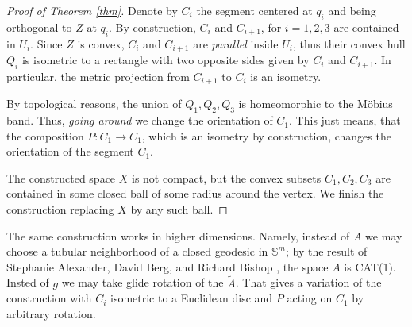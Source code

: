 \documentclass[a4paper,10pt]{article}
\begin{document}
\begin{proof}[Proof of Theorem \ref{thm}]
Denote by $C_i$ the segment centered at $q_i$ and being orthogonal to $Z$ at $q_i$.
By construction, $C_i$ and $C_{i+1}$, for $i=1,2,3$   are contained in $U_i$.
Since $Z$ is convex, $C_i$ and $C_{i+1}$ are \emph{parallel} inside $U_i$, thus their convex hull  $Q_i$ is isometric to a rectangle with two opposite sides given by $C_i$ and $C_{i+1}$.
In particular, the metric projection from $C_{i+1}$ to $C_{i}$ is an isometry.

By topological reasons, the union of $Q_1,Q_2,Q_3$ is homeomorphic to the Möbius band.
Thus, \emph{going around} we change the orientation of $C_1$.
This just means, that the composition $P:C_1\to C_1$, which is an isometry by construction, changes the orientation of the 
segment $C_1$.

The constructed space $X$ is not compact, but  the convex subsets $C_1,C_2,C_3$ are contained in some closed  ball of some radius around the vertex.  We finish the construction replacing $X$ by any such ball.	
\end{proof}

The same construction works in higher dimensions.
Namely, instead of $A$ we may choose a tubular neighborhood of a closed geodesic in $\mathbb{S}^m$;
by the result of Stephanie Alexander,  David Berg, and Richard Bishop \cite{ABB-1993}, the space $A$ is CAT(1).
Insted of $g$ we may take glide rotation of the $\tilde A$.
That gives a variation of the construction with $C_i$ isometric to a Euclidean disc and $P$ acting on $C_1$ by arbitrary rotation.

{\sloppy
\printbibliography[heading=bibintoc]
\fussy
}
\end{document}
